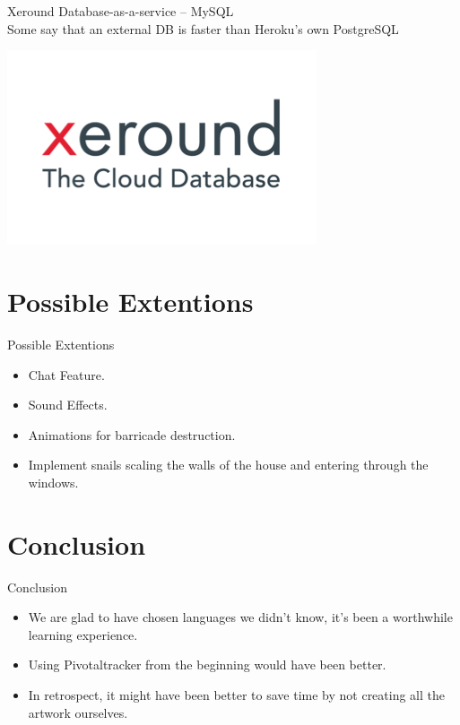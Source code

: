 \documentclass{beamer}
\begin{document}
\begin{frame}{Xeround}
  Database-as-a-service -- MySQL \\
  \vspace{\baselineskip}
  Some say that an external DB is faster than Heroku's own PostgreSQL
  \vspace{\baselineskip}
  \begin{center}
    \includegraphics[scale=0.25]{xeround.png} \\
  \end{center}
\end{frame}

\section{Possible Extentions}
\begin{frame}{Possible Extentions}
  \begin{itemize}
    \item Chat Feature.
    \item Sound Effects.
    \item Animations for barricade destruction.
    \item Implement snails scaling the walls of the house and entering through the windows.
  \end{itemize}
\end{frame}

\section{Conclusion}

\begin{frame}{Conclusion}
  \begin{itemize}
    \item We are glad to have chosen languages we didn't know, it's been a worthwhile learning experience.
    \item Using Pivotaltracker from the beginning would have been better.
    \item In retrospect, it might have been better to save time by not creating all the artwork ourselves.
  \end{itemize}
\end{frame}
\end{document}
